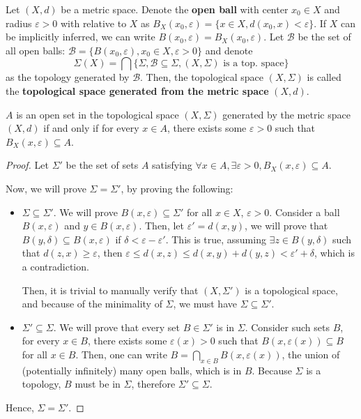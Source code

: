Let \( (X, d) \) be a metric space. Denote the \textbf{open ball} with center
\( x_{0} \in X \) and radius \( \varepsilon > 0 \) with relative to \( X \)
as \( B_{X}(x_{0}, \varepsilon) = \{x \in X, d(x_{0},x) < \varepsilon\}  \). If
\( X \) can be implicitly inferred, we can write \( B(x_{0}, \varepsilon) =
B_{X}(x_{0}, \varepsilon) \).
Let \( \mathcal{B} \) be the set
of all open balls: \( \mathcal{B} = \{B(x_{0}, \varepsilon), x_{0} \in X,
\varepsilon > 0\}   \) and denote
\[
  \Sigma(X) = \bigcap \{\Sigma, \mathcal{B} \subseteq \Sigma, (X, \Sigma) \text{ is a
  top. space}\}
\] as the topology generated by \( \mathcal{B} \). Then, the topological space
\( (X, \Sigma) \) is called the \textbf{topological space generated from the
metric space} \( (X, d) \).

\begin{theorem}
\label{thr:Open sets in topological spaces generated by a metric space}
  \( A \) is an open set in the topological space \( (X, \Sigma) \) generated by
  the metric space \( (X, d) \) if and only if for every \( x \in A \), there
  exists some \( \varepsilon > 0 \) such that \( B_{X}(x, \varepsilon) \subseteq
  A\).
\end{theorem}

\begin{proof}
  Let \( \Sigma' \) be the set of sets \( A \) satisfying \( \forall x \in A,
  \exists \varepsilon > 0, B_{X}(x, \varepsilon) \subseteq A \).

  Now, we will prove \( \Sigma = \Sigma' \), by proving the following:
  \begin{itemize}
  \item \( \Sigma \subseteq \Sigma' \). We will prove \( B(x, \varepsilon) \subseteq
    \Sigma'\) for all \( x \in X \), \( \varepsilon > 0 \).
    Consider a ball \( B(x, \varepsilon) \) and \( y \in B(x, \varepsilon) \).
    Then, let \( \varepsilon' = d(x, y) \), we will prove that \( B(y, \delta)
    \subseteq B(x, \varepsilon) \) if \( \delta < \varepsilon - \varepsilon' \).
    This is true, assuming \( \exists z \in B(y, \delta) \) such that \( d(z, x)
    \ge  \varepsilon\), then \( \varepsilon \le  d(x, z) \le d(x, y) + d(y, z) <
    \varepsilon' + \delta\), which is a contradiction.

    Then, it is trivial to manually verify that \( (X, \Sigma') \) is a topological
    space, and because of the minimality of \( \Sigma \), we must have \( \Sigma
    \subseteq \Sigma'\).

  \item \( \Sigma' \subseteq \Sigma \). We will prove that every set \( B
    \in \Sigma' \) is in \( \Sigma \). Consider such sets \( B \), for every \(
    x \in B\), there exists some \( \varepsilon(x) > 0 \) such that \( B(x,
    \varepsilon(x)) \subseteq B \) for all \( x \in B \). Then, one can write \(
    B = \bigcap_{x \in B} B(x, \varepsilon(x))\), the union of (potentially
    infinitely) many open balls, which is in \( B \).
    Because \( \Sigma \) is a topology, \( B \)
    must be in \( \Sigma \), therefore \( \Sigma' \subseteq \Sigma \).
  \end{itemize}

  Hence, \( \Sigma = \Sigma' \).
\end{proof}

